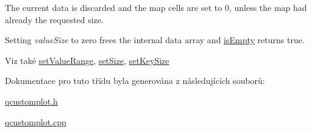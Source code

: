 The current data is discarded and the map cells are set to 0, unless the map had already the requested size.

Setting {\itshape value\+Size} to zero frees the internal data array and \hyperlink{classQCPColorMapData_a986009324aee1fc5f696db46bd03dde5}{is\+Empty} returns true.

\begin{DoxySeeAlso}{Viz také}
\hyperlink{classQCPColorMapData_ada1b2680ba96a5f4175b6d341cf75d23}{set\+Value\+Range}, \hyperlink{classQCPColorMapData_a0d9ff35c299d0478b682bfbcdd9c097e}{set\+Size}, \hyperlink{classQCPColorMapData_ac7ef70e383aface34b44dbde49234b6b}{set\+Key\+Size} 
\end{DoxySeeAlso}


Dokumentace pro tuto třídu byla generována z následujících souborů\+:\begin{DoxyCompactItemize}
\item 
\hyperlink{qcustomplot_8h}{qcustomplot.\+h}\item 
\hyperlink{qcustomplot_8cpp}{qcustomplot.\+cpp}\end{DoxyCompactItemize}
